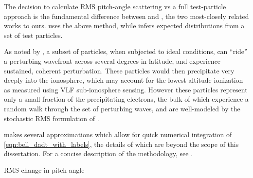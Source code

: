 The decision to calculate RMS pitch-angle scattering vs a full test-particle approach is the fundamental difference between \cite{Lauben1998} and \cite{Bortnik2005}, the two most-closely related works to ours. \citeauthor{Bortnik2006} uses the above method, while \citeauthor{Lauben1998} infers expected distributions from a set of test particles. 

As noted by \cite{Lauben1998, Lauben2001}, a subset of particles, when subjected to ideal conditions, can ``ride'' a perturbing wavefront across several degrees in latitude, and experience sustained, coherent perturbation. These particles would then precipitate very deeply into the ionosphere, which may account for the lowest-altitude ionization as measured using VLF sub-ionosphere sensing. However these particles represent only a small fraction of the precipitating electrons, the bulk of which experience a random walk through the set of perturbing waves, and are well-modeled by the stochastic RMS formulation of \citeauthor{Bortnik2005}.

\citeauthor{Bortnik2005} makes several approximations which allow for quick numerical integration of \eqref{eqn:bell_dadt_with_labels}, the details of which are beyond the scope of this dissertation. For a concise description of the methodology, see \cite{Bortnik2006}.

\begin{algorithm}[t]
\caption{RMS change in pitch angle}\label{alg:RMS_change}
\begin{algorithmic}[1]
						 
						 
					\EndFor
				\EndFor
			\EndFor
		\EndFor
	\EndFor
\EndFor
\end{algorithmic}
\end{algorithm}


